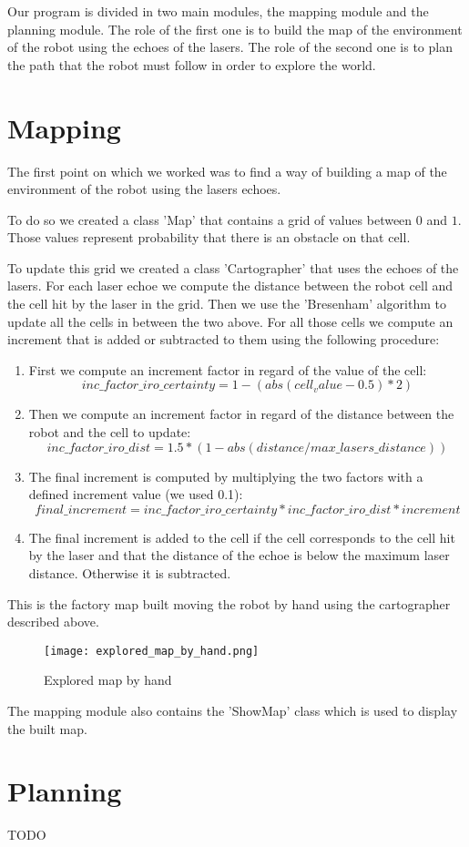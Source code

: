 Our program is divided in two main modules, the mapping module and the planning module.
The role of the first one is to build the map of the environment of the robot using the echoes of the lasers.
The role of the second one is to plan the path that the robot must follow in order to explore the world.

\section{Mapping}

The first point on which we worked was to find a way of building a map of the environment of the robot using the lasers echoes.

To do so we created a class 'Map' that contains a grid of values between $0$ and $1$.
Those values represent probability that there is an obstacle on that cell.

To update this grid we created a class 'Cartographer' that uses the echoes of the lasers.
For each laser echoe we compute the distance between the robot cell and the cell hit by the laser in the grid.
Then we use the 'Bresenham' algorithm to update all the cells in between the two above.
For all those cells we compute an increment that is added or subtracted to them using the following procedure:

\begin{enumerate}
    \item First we compute an increment factor in regard of the value of the cell:
        $$
        inc\_factor\_iro\_certainty = 1 - (abs(cell_value - 0.5) * 2)
        $$
    \item Then we compute an increment factor in regard of the distance between the robot and the cell to update:
        $$
        inc\_factor\_iro\_dist = 1.5 * (1 - abs(distance / max\_lasers\_distance))
        $$
    \item The final increment is computed by multiplying the two factors with a defined increment value (we used 0.1):
        $$
        final\_increment = inc\_factor\_iro\_certainty * inc\_factor\_iro\_dist * increment
        $$
    \item The final increment is added to the cell if the cell corresponds to the cell hit by the laser and that the distance of the echoe is below the maximum laser distance.
        Otherwise it is subtracted.
\end{enumerate}

This is the factory map built moving the robot by hand using the cartographer described above.

\FloatBarrier
\begin{figure}
    \centering\texttt{[image: explored\_map\_by\_hand.png]}
    \label{fig:explored_map_by_hand}
    \caption{Explored map by hand}
\end{figure}
\FloatBarrier

The mapping module also contains the 'ShowMap' class which is used to display the built map.

\section{Planning}

TODO

